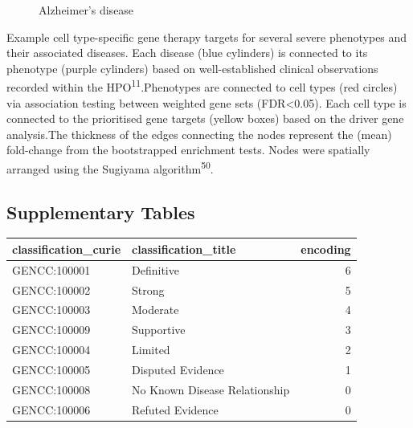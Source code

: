 \documentclass[
]{report}
\begin{document}
\newpage{}

\begin{figure}


\caption{\label{fig-therapy-examples-supp-g}Alzheimer's disease}

\end{figure}%

Example cell type-specific gene therapy targets for several severe
phenotypes and their associated diseases. Each disease (blue cylinders)
is connected to its phenotype (purple cylinders) based on
well-established clinical observations recorded within the
HPO\textsuperscript{11}.Phenotypes are connected to cell types (red
circles) via association testing between weighted gene sets
(FDR\textless0.05). Each cell type is connected to the prioritised gene
targets (yellow boxes) based on the driver gene analysis.The thickness
of the edges connecting the nodes represent the (mean) fold-change from
the bootstrapped enrichment tests. Nodes were spatially arranged using
the Sugiyama algorithm\textsuperscript{50}.

\subsection{Supplementary Tables}\label{supplementary-tables}

\begin{longtable}[]{@{}llr@{}}
\toprule\noalign{}
classification\_curie & classification\_title & encoding \\
\midrule\noalign{}
\endhead
\bottomrule\noalign{}
\endlastfoot
GENCC:100001 & Definitive & 6 \\
GENCC:100002 & Strong & 5 \\
GENCC:100003 & Moderate & 4 \\
GENCC:100009 & Supportive & 3 \\
GENCC:100004 & Limited & 2 \\
GENCC:100005 & Disputed Evidence & 1 \\
GENCC:100008 & No Known Disease Relationship & 0 \\
GENCC:100006 & Refuted Evidence & 0 \\
\end{longtable}
\end{document}
